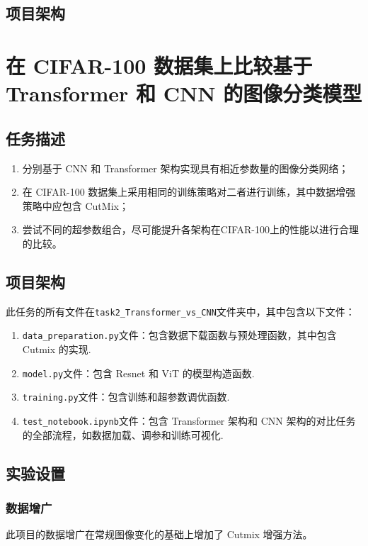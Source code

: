 \documentclass[notitlepage,cs4size,punct,oneside]{ctexrep}
\numberwithin{equation}{chapter}
\theoremstyle{mystyle}
\begin{document}
\section{项目架构}





\chapter{在 CIFAR-100 数据集上比较基于 Transformer 和 CNN 的图像分类模型}
\section{任务描述}
\begin{enumerate}
\item 分别基于 CNN 和 Transformer 架构实现具有相近参数量的图像分类网络；
\item 在 CIFAR-100 数据集上采用相同的训练策略对二者进行训练，其中数据增强策略中应包含 CutMix；
\item 尝试不同的超参数组合，尽可能提升各架构在CIFAR-100上的性能以进行合理的比较。
\end{enumerate}


\section{项目架构}
此任务的所有文件在\texttt{task2\_Transformer\_vs\_CNN}文件夹中，其中包含以下文件：
\begin{enumerate}
\item \texttt{data\_preparation.py}文件：包含数据下载函数与预处理函数，其中包含 Cutmix 的实现.
\item \texttt{model.py}文件：包含 Resnet 和 ViT 的模型构造函数.
\item \texttt{training.py}文件：包含训练和超参数调优函数.
\item \texttt{test\_notebook.ipynb}文件：包含 Transformer 架构和 CNN 架构的对比任务的全部流程，如数据加载、调参和训练可视化.
\end{enumerate}

\section{实验设置}
\subsection{数据增广}
此项目的数据增广在常规图像变化的基础上增加了 Cutmix 增强方法。
\end{document}
